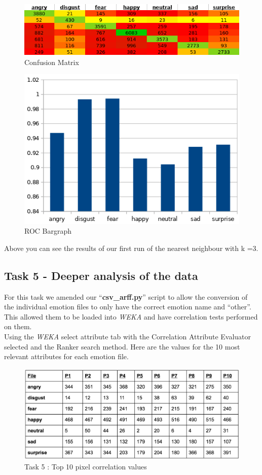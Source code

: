 \documentclass[12pt]{article}
\begin{document}
\begin{figure}[H]
	\centering
	\includegraphics[width=0.7\linewidth]{images/heatmap}
	\caption{Confusion Matrix}
	\label{fig:heatmap}
\end{figure}

\begin{figure}[H]
	\centering
	\includegraphics[width=0.5\linewidth]{images/roc_graph}
	\caption{ROC Bargraph}
	\label{fig:roc_graph}
\end{figure}


Above you can see the results of our first run of the nearest neighbour with k =3.\\

\subsection{Task 5 - Deeper analysis of the data }

For this task we amended our ``\textbf{csv\_arff.py}'' script to allow the conversion of the individual emotion files to only have the correct emotion name and “other”. This allowed them to be loaded into \textit{WEKA} and have correlation tests performed on them.\\

Using the \textit{WEKA} select attribute tab with the Correlation Attribute Evaluator selected and the Ranker search method. Here are the values for the 10 most relevant attributes for each emotion file.\\

\begin{figure}[H]
	\centering
	\includegraphics[width=0.7\linewidth]{images/task5_results}
	\caption{Task 5 : Top 10 pixel correlation values}
	\label{fig:task5_results}
\end{figure}
\end{document}
